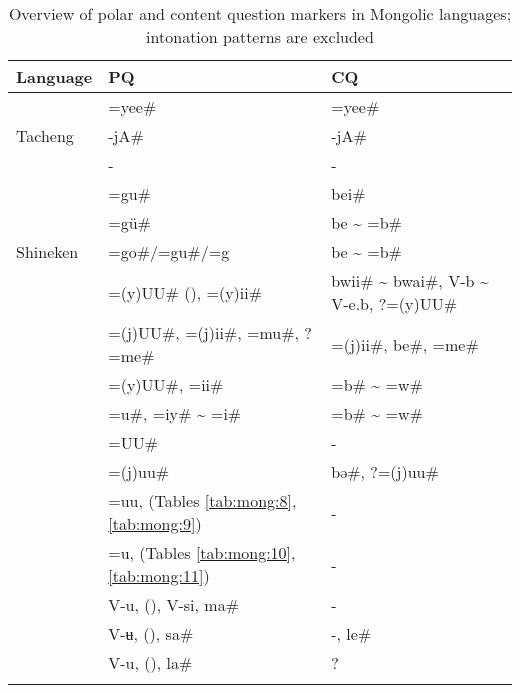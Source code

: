 \begin{table} 
\caption{Overview of polar and content question markers in Mongolic languages; intonation patterns are excluded}
\label{tab:mong:12}

\begin{tabularx}{\textwidth}{llQ}
\lsptoprule

\textbf{Language} & \textbf{PQ} & \textbf{CQ}\\
\midrule
{} & =yee\# & =yee\#\\
Tacheng  & -jA\# & -jA\#\\
 & - & -\\
 & =gu\# & bei\#\\
 & =gü\# & be {\textasciitilde} =b\#\\
Shineken  & =go\#/=gu\#/=g & be {\textasciitilde} =b\#\\
 & =(y)UU\# (), =(y)ii\# & bwii\# {\textasciitilde} bwai\#, V-b {\textasciitilde} V-e.b, ?=(y)UU\#\\
 & =(j)UU\#, =(j)ii\#, =mu\#, ?=me\# & =(j)ii\#, be\#, =me\#\\
 & =(y)UU\#, =ii\# & =b\# {\textasciitilde} =w\#\\
 & =u\#, =iy\# {\textasciitilde} =i\# & =b\# {\textasciitilde} =w\#\\
 & =UU\# & -\\
 & =(j)uu\# & bə\#, ?=(j)uu\#\\
 & =uu, (Tables \ref{tab:mong:8}, \ref{tab:mong:9}) & -\\
 & =u, (Tables \ref{tab:mong:10}, \ref{tab:mong:11}) & -\\
 & V-u, (), V-si, ma\# & -\\
 & V-ʉ, (), sa\# & -, le\#\\
 & V-u, (), la\# & ?\\
\lspbottomrule
\end{tabularx}
\end{table}




